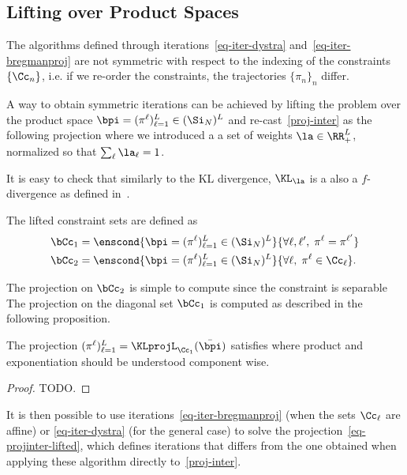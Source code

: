 
\subsection{Lifting over Product Spaces}


The algorithms defined through iterations~\eqref{eq-iter-dystra} and~\eqref{eq-iter-bregmanproj} are not symmetric with respect to the indexing of the constraints $\{\Cc_n\}$, i.e. if we re-order the constraints, the trajectories $\{\pi_n\}_n$ differ.

A way to obtain symmetric iterations can be achieved by lifting the problem over the product space $\bpi = (\pi^\ell)_{\ell=1}^L \in (\Si_N)^L$ and re-cast~\eqref{proj-inter} as the following projection
where we introduced a a set of weights $\la \in \RR_+^L$, normalized so that $\sum_\ell \la_\ell=1$.

It is easy to check that similarly to the KL divergence, $\KL_\la$ is a also a $f$-divergence as defined in~\cite{}.

The lifted constraint sets are defined as
\begin{align*}
	\bCc_1 &= \enscond{ 
		\bpi = (\pi^\ell)_{\ell=1}^L \in (\Si_N)^L
	}{
		\forall \ell, \ell', \; \pi^\ell = \pi^{\ell'}
	} \\
	\bCc_2 &= \enscond{ 
		\bpi = (\pi^\ell)_{\ell=1}^L \in (\Si_N)^L
	}{
		\forall \ell, \; \pi^\ell \in \Cc_\ell
	} .
\end{align*}

The projection on $\bCc_2$ is simple to compute since the constraint is separable
The projection on the diagonal set $\bCc_1$ is computed as described in the following proposition. 

\begin{prop}
	The projection $(\pi^\ell)_{\ell=1}^L = \KLprojL_{\Cc_1}(\bar\bpi)$ satisfies 
	where product and exponentiation should be understood component wise. 
\end{prop}
\begin{proof}
	TODO.
\end{proof}

It is then possible to use iterations~\eqref{eq-iter-bregmanproj} (when the sets $\Cc_\ell$ are affine) or \eqref{eq-iter-dystra} (for the general case) to solve the projection~\eqref{eq-projinter-lifted}, which defines iterations that differs from the one obtained when applying these algorithm directly to~\eqref{proj-inter}.